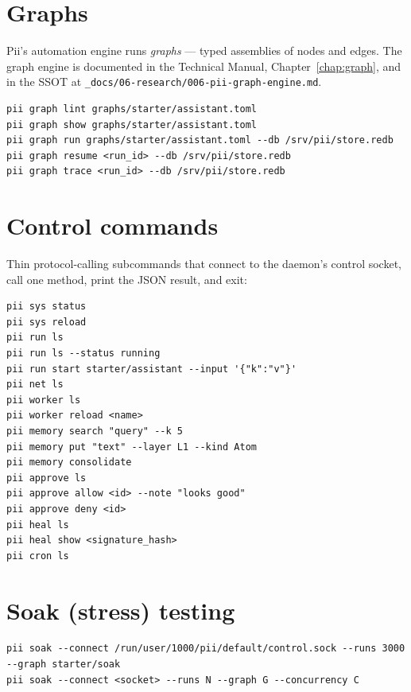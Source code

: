\documentclass[
	fontsize=10pt,
	twoside=false,
	secnumdepth=2,
	open=any,
]{kaobook}
\begin{document}
\section{Graphs}

Pii's automation engine runs \emph{graphs} — typed assemblies of nodes
and edges. The graph engine is documented in the Technical Manual,
Chapter~\ref{chap:graph}, and in the SSOT at
\texttt{\_docs/06-research/006-pii-graph-engine.md}.

\begin{cmdbox}
\begin{lstlisting}
pii graph lint graphs/starter/assistant.toml
pii graph show graphs/starter/assistant.toml
pii graph run graphs/starter/assistant.toml --db /srv/pii/store.redb
pii graph resume <run_id> --db /srv/pii/store.redb
pii graph trace <run_id> --db /srv/pii/store.redb
\end{lstlisting}
\end{cmdbox}

\section{Control commands}

Thin protocol-calling subcommands that connect to the daemon's control
socket, call one method, print the JSON result, and exit:

\begin{cmdbox}[Control]
\begin{lstlisting}
pii sys status
pii sys reload
pii run ls
pii run ls --status running
pii run start starter/assistant --input '{"k":"v"}'
pii net ls
pii worker ls
pii worker reload <name>
pii memory search "query" --k 5
pii memory put "text" --layer L1 --kind Atom
pii memory consolidate
pii approve ls
pii approve allow <id> --note "looks good"
pii approve deny <id>
pii heal ls
pii heal show <signature_hash>
pii cron ls
\end{lstlisting}
\end{cmdbox}

\section{Soak (stress) testing}

\begin{cmdbox}[Soak]
\begin{lstlisting}
pii soak --connect /run/user/1000/pii/default/control.sock --runs 3000 --graph starter/soak
pii soak --connect <socket> --runs N --graph G --concurrency C
\end{lstlisting}
\end{cmdbox}
\end{document}
